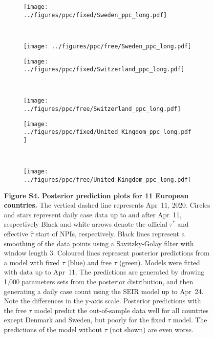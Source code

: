 \documentclass[12pt]{extarticle}
\begin{document}
\begin{figure}
    \ContinuedFloat 
    \begin{subfigure}{0.45\textwidth}
        \texttt{[image: ../figures/ppc/fixed/Sweden\_ppc\_long.pdf]}
    \end{subfigure}
    ~
    \begin{subfigure}{0.45\textwidth}
        \texttt{[image: ../figures/ppc/free/Sweden\_ppc\_long.pdf]}
    \end{subfigure}
    \begin{subfigure}{0.45\textwidth}
        \texttt{[image: ../figures/ppc/fixed/Switzerland\_ppc\_long.pdf]}
    \end{subfigure}
    ~
    \begin{subfigure}{0.45\textwidth}
        \texttt{[image: ../figures/ppc/free/Switzerland\_ppc\_long.pdf]}
    \end{subfigure}
    \begin{subfigure}{0.45\textwidth}
        \texttt{[image: ../figures/ppc/fixed/United\_Kingdom\_ppc\_long.pdf]}
    \end{subfigure}
    ~
    \begin{subfigure}{0.45\textwidth}
        \texttt{[image: ../figures/ppc/free/United\_Kingdom\_ppc\_long.pdf]}
    \end{subfigure}
    \caption{
    \textbf{Figure S4. Posterior prediction plots for 11 European countries.}
    The vertical dashed line represents Apr~11, 2020.
    Circles and stars represent daily case data up to and after Apr~11, respectively
    Black and white arrows denote the official $\tau^*$ and effective $\hat{\tau}$ start of NPIs, respectively.
    Black lines represent a smoothing of the data points using a Savitzky-Golay filter with window length 3. 
    Coloured lines represent posterior predictions from a model with fixed $\tau$ (blue) and free $\tau$ (green). Models were fitted with data up to Apr~11. The predictions are generated by drawing 1,000 parameters sets from the posterior distribution, and then generating a daily case count using the SEIR model up to Apr~24. Note the differences in the y-axis scale.
    Posterior predictions with the free $\tau$ model predict the out-of-sample data well for all countries except Denmark and Sweden, but poorly for the fixed $\tau$ model.
    The predictions of the model without $\tau$ (not shown) are even worse.
    }	
\end{figure}
\end{document}
